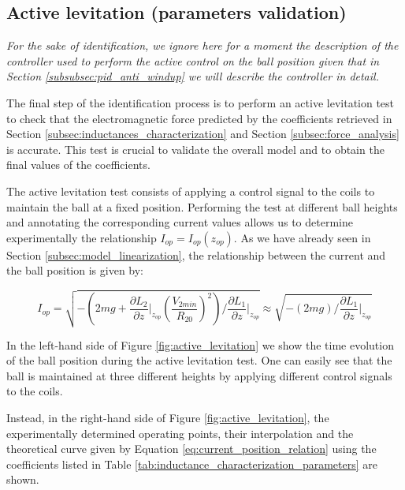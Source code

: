 \subsection{Active levitation (parameters validation)}
\label{subsec:active_levitation}

\textit{
    For the sake of identification, we ignore here for a moment the description of the controller used to perform the active control on the ball position given that in Section \ref{subsubsec:pid_anti_windup} we will describe the controller in detail.
}

The final step of the identification process is to perform an active levitation test to check that the electromagnetic force predicted by the coefficients retrieved in Section \ref{subsec:inductances_characterization} and Section \ref{subsec:force_analysis} is accurate.
This test is crucial to validate the overall model and to obtain the final values of the coefficients.

The active levitation test consists of applying a control signal to the coils to maintain the ball at a fixed position.
Performing the test at different ball heights and annotating the corresponding current values allows us to determine experimentally the relationship $I_{op} = I_{op}(z_{op})$.
As we have already seen in Section \ref{subsec:model_linearization}, the relationship between the current and the ball position is given by:

\begin{equation}
    I_{op} = \sqrt{ - \left(2m g + \frac{\partial L_2}{\partial z} \big|_{z_{op}} (\frac{V_{2min}}{R_{20}})^2 \right) / \frac{\partial L_1}{\partial z} \big|_{z_{op}} } \approx \sqrt{ - \left(2m g \right) / \frac{\partial L_1}{\partial z} \big|_{z_{op}} }
    \label{eq:current_position_relation}
\end{equation}

In the left-hand side of Figure \ref{fig:active_levitation} we show the time evolution of the ball position during the active levitation test.
One can easily see that the ball is maintained at three different heights by applying different control signals to the coils.

Instead, in the right-hand side of Figure \ref{fig:active_levitation}, the experimentally determined operating points, their interpolation and the theoretical curve given by Equation \ref{eq:current_position_relation} using the coefficients listed in Table \ref{tab:inductance_characterization_parameters} are shown.

